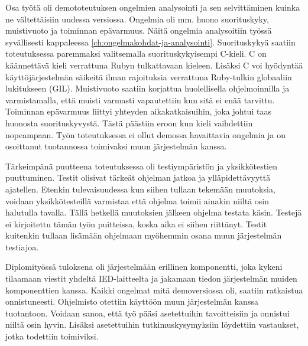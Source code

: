 Osa työtä oli demototeutuksen ongelmien analysointi ja sen selvittäminen kuinka ne vältettäisiin uudessa versiossa. Ongelmia oli mm. huono suorituskyky, muistivuoto ja toiminnan epävarmuus. Näitä ongelmia analysoitiin työssä syvällisesti kappaleessa \ref{ch:ongelmakohdat-ja-analysointi}. Suorituskykyä saatiin toteutuksessa paremmaksi valitsemalla suorituskykyisempi C-kieli. C on käännettävä kieli verrattuna Rubyn tulkattavaan kieleen. Lisäksi C voi hyödyntää käyttöjärjestelmän säikeitä ilman rajoituksia verrattuna Ruby-tulkin globaaliin lukitukseen (GIL). Muistivuoto saatiin korjattua huolellisella ohjelmoinnilla ja varmistamalla, että muisti varmasti vapautettiin kun sitä ei enää tarvittu. Toiminnan epävarmuus liittyi yhteyden aikakatkaisuihin, joka johtui taas huonosta suorituskyvystä. Tästä päästiin eroon kun kieli vaihdettiin nopeampaan. Työn toteutuksessa ei ollut demossa havaittavia ongelmia ja on osoittanut tuotannossa toimivaksi muun järjestelmän kanssa.

Tärkeimpänä puutteena toteutuksessa oli testiympäristön ja yksikkötestien puuttuminen. Testit olisivat tärkeät ohjelman jatkoa ja ylläpidettävyyttä ajatellen. Etenkin tulevaisuudessa kun siihen tullaan tekemään muutoksia, voidaan yksikkötesteillä varmistaa että ohjelma toimii ainakin niiltä osin halutulla tavalla. Tällä hetkellä muutoksien jälkeen ohjelma testata käsin. Testejä ei kirjoitettu tämän työn puitteissa, koska aika ei siihen riittänyt. Testit kuitenkin tullaan lisämään ohjelmaan myöhemmin osana muun järjestelmän testiajoa.

Diplomityössä tuloksena oli järjestelmään erillinen komponentti, joka kykeni tilaamaan viestit yhdeltä IED-laitteelta ja jakamaan tiedon järjestelmän muiden komponenttien kanssa. Kaikki ongelmat mitä demoversiossa oli, saatiin ratkaistua onnistuneesti. Ohjelmisto otettiin käyttöön muun järjestelmän kanssa tuotantoon. Voidaan sanoa, että työ pääsi asetettuihin tavoitteisiin ja onnistui niiltä osin hyvin. Lisäksi asetettuihin tutkimuskysymyksiin löydettiin vastaukset, jotka todettiin toimiviksi.